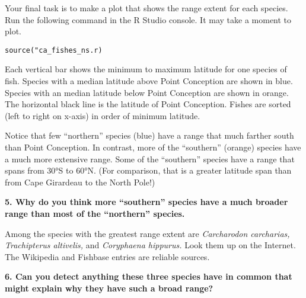 \documentclass[11pt]{article}
\begin{document}
Your final task is to make a plot that shows the range extent for each species. Run the following command in the R Studio console. It may take a moment to plot.

\texttt{source("ca\_fishes\_ns.r)}

Each vertical bar shows the minimum to maximum latitude for one species of fish. Species with a median latitude above Point Conception are shown in blue. Species with an median latitude below Point Conception are shown in orange. The horizontal black line is the latitude of Point Conception. Fishes are sorted (left to right on x-axis) in order of minimum latitude.

Notice that few “northern” species (blue) have a range that much farther south than Point Conception. In contrast, more of the “southern” (orange) species have a much more extensive range. Some of the “southern” species have a range that spans from 30°S to 60°N. (For comparison, that is a greater latitude span than from Cape Girardeau to the North Pole!) 

\textbf{5. Why do you think more “southern” species have a much broader range than most of the “northern” species.}

	
	\vspace{9\baselineskip}
	
	Among the species with the greatest range extent are \textit{Carcharodon carcharias,} \textit{Trachipterus altivelis,} and \textit{Coryphaena hippurus.} Look them up on the Internet. The Wikipedia and Fishbase entries are reliable sources. 
	
\textbf{6. Can you detect anything these three species have in common that might explain why they have such a broad range?}
	
\end{document}
